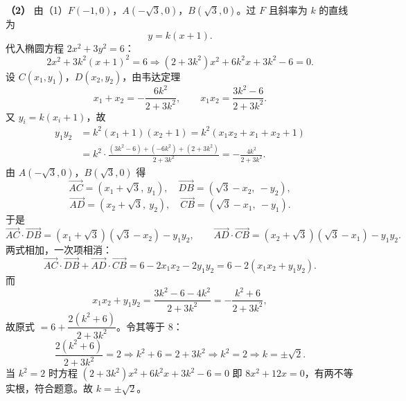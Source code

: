 \begin{answer}
\textbf{（2）} 由（1）$F(-1,0)$，$A(-\sqrt3,0)$，$B(\sqrt3,0)$。过 $F$ 且斜率为 $k$ 的直线为
\nopagebreak[4]
\[y=k(x+1).\]
代入椭圆方程 $2x^2+3y^2=6$：
\nopagebreak[4]
\[2x^2+3k^2(x+1)^2=6\Longrightarrow(2+3k^2)x^2+6k^2x+3k^2-6=0.\]
设 $C(x_1,y_1)$，$D(x_2,y_2)$，由韦达定理
\nopagebreak[4]
\[x_1+x_2=-\frac{6k^2}{2+3k^2},\qquad x_1x_2=\frac{3k^2-6}{2+3k^2}.\]
又 $y_i=k(x_i+1)$，故
\nopagebreak[4]
\[\begin{aligned}
y_1y_2&=k^2(x_1+1)(x_2+1)=k^2\left(x_1x_2+x_1+x_2+1\right)\\
&=k^2\cdot\frac{(3k^2-6)+(-6k^2)+(2+3k^2)}{2+3k^2}=-\frac{4k^2}{2+3k^2}.
\end{aligned}\]
由 $A(-\sqrt3,0)$，$B(\sqrt3,0)$ 得
\nopagebreak[4]
\[\overrightarrow{AC}=(x_1+\sqrt3,\ y_1),\quad\overrightarrow{DB}=(\sqrt3-x_2,\ -y_2),\]
\nopagebreak[4]
\[\overrightarrow{AD}=(x_2+\sqrt3,\ y_2),\quad\overrightarrow{CB}=(\sqrt3-x_1,\ -y_1).\]
于是
\nopagebreak[4]
\[\overrightarrow{AC}\cdot\overrightarrow{DB}=(x_1+\sqrt3)(\sqrt3-x_2)-y_1y_2,\qquad
\overrightarrow{AD}\cdot\overrightarrow{CB}=(x_2+\sqrt3)(\sqrt3-x_1)-y_1y_2.\]
两式相加，一次项相消：
\nopagebreak[4]
\[\overrightarrow{AC}\cdot\overrightarrow{DB}+\overrightarrow{AD}\cdot\overrightarrow{CB}=6-2x_1x_2-2y_1y_2=6-2(x_1x_2+y_1y_2).\]
而
\nopagebreak[4]
\[x_1x_2+y_1y_2=\frac{3k^2-6-4k^2}{2+3k^2}=-\frac{k^2+6}{2+3k^2},\]
故原式 $=6+\dfrac{2(k^2+6)}{2+3k^2}$。令其等于 $8$：
\nopagebreak[4]
\[\frac{2(k^2+6)}{2+3k^2}=2\Longrightarrow k^2+6=2+3k^2\Longrightarrow k^2=2\Longrightarrow k=\pm\sqrt2.\]
当 $k^2=2$ 时方程 $(2+3k^2)x^2+6k^2x+3k^2-6=0$ 即 $8x^2+12x=0$，有两不等实根，符合题意。故 $k=\pm\sqrt2$。



\end{answer}

